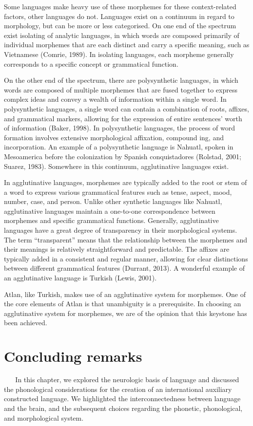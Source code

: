 Some languages make heavy use of these morphemes for these context-related factors, other languages do not. Languages exist on a continuum in regard to morphology, but can be more or less categorised. On one end of the spectrum exist isolating of analytic languages, in which words are composed primarily of individual morphemes that are each distinct and carry a specific meaning, such as Vietnamese (Comrie, 1989). In isolating languages, each morpheme generally corresponds to a specific concept or grammatical function. 

On the other end of the spectrum, there are polysynthetic languages, in which words are composed of multiple morphemes that are fused together to express complex ideas and convey a wealth of information within a single word. In polysynthetic languages, a single word can contain a combination of roots, affixes, and grammatical markers, allowing for the expression of entire sentences' worth of information (Baker, 1998). In polysynthetic languages, the process of word formation involves extensive morphological affixation, compound ing, and incorporation. An example of a polysynthetic language is Nahuatl, spoken in Mesoamerica before the colonization by Spanish conquistadores (Rolstad, 2001; Suarez, 1983). Somewhere in this continuum, agglutinative languages exist. 

In agglutinative languages, morphemes are typically added to the root or stem of a word to express various grammatical features such as tense, aspect, mood, number, case, and person. Unlike other synthetic languages like Nahuatl, agglutinative languages maintain a one-to-one correspondence between morphemes and specific grammatical functions. Generally, agglutinative languages have a great degree of transparency in their morphological systems. The term “transparent” means that the relationship between the morphemes and their meanings is relatively straightforward and predictable. The affixes are typically added in a consistent and regular manner, allowing for clear distinctions between different grammatical features (Durrant, 2013). A wonderful example of an agglutinative language is Turkish (Lewis, 2001). 

Atlan, like Turkish, makes use of an agglutinative system for morphemes. One of the core elements of Atlan is that unambiguity is a prerequisite. In choosing an agglutinative system for morphemes, we are of the opinion that this keystone has been achieved.  
  
  
\section{Concluding remarks} 
  
\noindent In this chapter, we explored the neurologic basis of language and discussed the phonological considerations for the creation of an international auxiliary constructed language. We highlighted the interconnectedness between language and the brain, and the subsequent choices regarding the phonetic, phonological, and morphological system.

